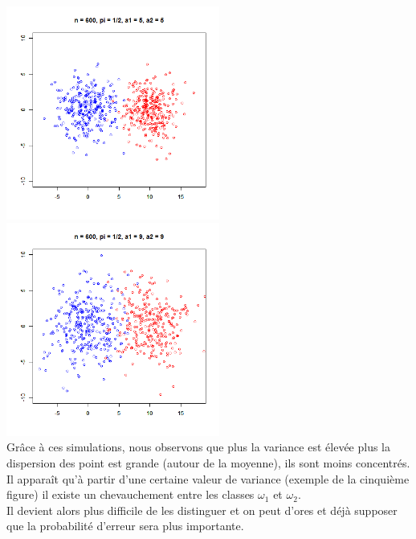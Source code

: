 \documentclass[a4paper, 8pt]{article}
\begin{document}
\includegraphics[height = 7cm, width = 7cm]{plots/plot_simul_4.png}\\
\includegraphics[height = 7cm, width = 7cm]{plots/plot_simul_5.png}\\
Grâce à ces simulations, nous observons que plus la variance est élevée plus la dispersion des point est grande (autour de la moyenne), ils sont moins concentrés.
 Il apparaît qu’à partir d’une certaine valeur de variance (exemple de la cinquième figure) il existe un chevauchement entre les classes $\omega_{1}$ et $\omega_{2}$.\\
Il devient alors plus difficile de les distinguer et on peut d’ores et déjà supposer que la probabilité d’erreur sera plus importante.\\ \\
\newpage
\noindent
\end{document}
